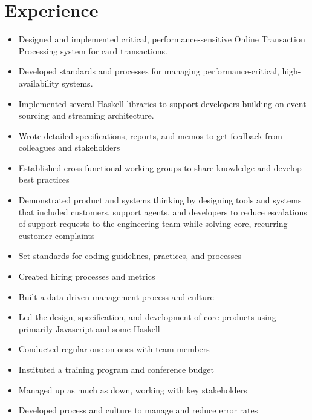 \documentclass[11pt,a4paper,sans]{moderncv}   %
\begin{document}
\section{Experience}
{\begin{itemize}%
  \item Designed and implemented critical, performance-sensitive
    Online Transaction Processing system for card transactions.
  \item Developed standards and processes for managing
    performance-critical, high-availability systems.
  \item Implemented several Haskell libraries to support developers
    building on event sourcing and streaming architecture.
  \item Wrote detailed specifications, reports, and memos to get
    feedback from colleagues and stakeholders
  \item Established cross-functional working groups to share knowledge
    and develop best practices
  \item Demonstrated product and systems thinking by designing tools
    and systems that included customers, support agents, and
    developers to reduce escalations of support requests to the
    engineering team while solving core, recurring customer complaints
\end{itemize}}
{\begin{itemize}%
  \item Set standards for coding guidelines, practices, and processes
  \item Created hiring processes and metrics
  \item Built a data-driven management process and culture
  \item Led the design, specification, and development of core
    products using primarily Javascript and some Haskell
  \item Conducted regular one-on-ones with team members
  \item Instituted a training program and conference budget
  \item Managed up as much as down, working with key stakeholders
  \item Developed process and culture to manage and reduce error rates
\end{itemize}}
\end{document}
